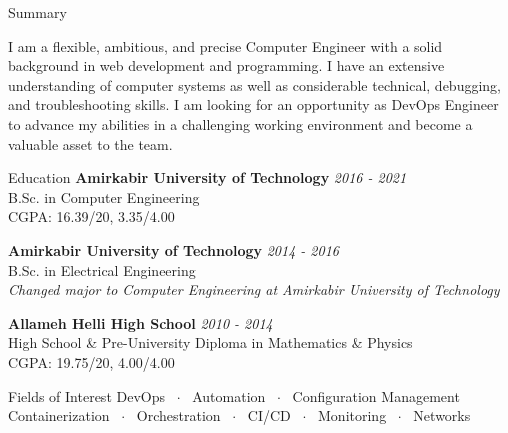 \documentclass{resume} %
\begin{document}
\begin{rSection}{Summary}

  I am a flexible, ambitious, and precise Computer Engineer with a solid background in web development and programming.
  I have an extensive understanding of computer systems as well as considerable technical, debugging, and troubleshooting skills.
  I am looking for an opportunity as DevOps Engineer to advance my abilities in a challenging working environment and become a valuable asset to the team.
\end{rSection}

\begin{rSection}{Education}
  {\bf Amirkabir University of Technology} \hfill {\em 2016 - 2021} \\
  B.Sc. in Computer Engineering \\
  CGPA: 16.39/20, 3.35/4.00

  {\bf Amirkabir University of Technology} \hfill {\em 2014 - 2016} \\
  B.Sc. in Electrical Engineering \\
  {\em Changed major to Computer Engineering at Amirkabir University of Technology}

  {\bf Allameh Helli High School} \hfill {\em 2010 - 2014} \\
  High School \& Pre-University Diploma in Mathematics \& Physics \\
  CGPA: 19.75/20, 4.00/4.00
\end{rSection}

\begin{rSection}{Fields of Interest}
  DevOps ~$\cdot$~ Automation ~$\cdot$~ Configuration Management \\[1ex]
  Containerization ~$\cdot$~ Orchestration ~$\cdot$~ CI/CD ~$\cdot$~ Monitoring ~$\cdot$~ Networks
\end{rSection}
\end{document}
